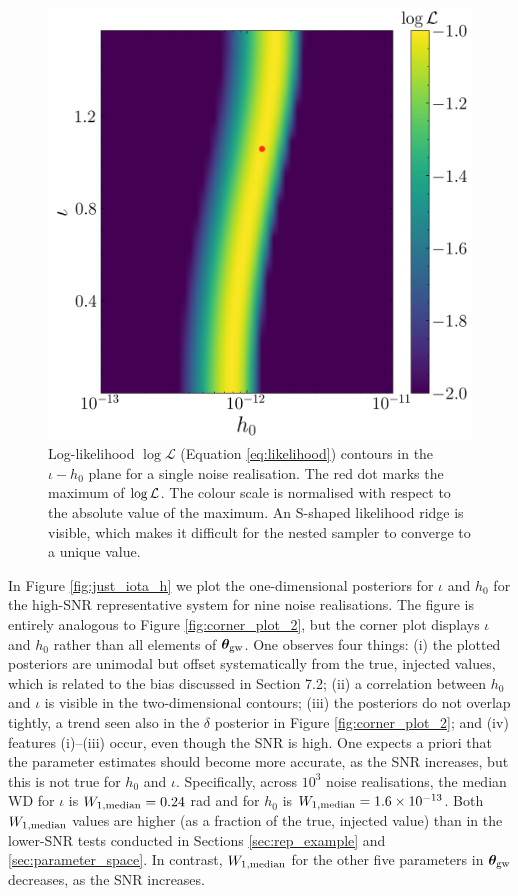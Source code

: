 \documentclass[fleqn,usenatbib,useAMS]{mnras}
\begin{document}
\begin{figure}
	\centering
	\includegraphics[width=\columnwidth]{images/likelihood_surface}
	\caption{Log-likelihood $\log \mathcal{L}$ (Equation \ref{eq:likelihood}) contours in the $\iota - h_0$ plane for a single noise realisation. The red dot marks the maximum of $\log {\cal L}$. The colour scale is normalised with respect to the absolute value of the maximum. An S-shaped likelihood ridge is visible, which makes it difficult for the nested sampler to converge to a unique value.}
	\label{fig:likelihood_surface}
\end{figure}
In Figure \ref{fig:just_iota_h} we plot the one-dimensional posteriors for $\iota$ and $h_0$ for the high-SNR representative system for nine noise realisations. 
The figure is entirely analogous to Figure \ref{fig:corner_plot_2}, but the corner plot displays $\iota$ and $h_0$ rather than all elements of $\boldsymbol{\theta}_{\rm gw}$. One observes four things: (i) the plotted posteriors are unimodal but offset systematically from the true, injected values, which is related to the bias discussed in Section 7.2; (ii) a correlation between $h_0$ and $\iota$ is visible in the two-dimensional contours; (iii) the posteriors do not overlap tightly, a trend seen also in the $\delta$ posterior in Figure \ref{fig:corner_plot_2}; and (iv) features (i)--(iii) occur, even though the SNR is high. One expects a priori that the parameter estimates should become more accurate, as the SNR increases, but this is not true for $h_0$ and $\iota$. Specifically, across $10^3$ noise realisations, the median WD for $\iota$ is $W_{1, \rm median}=0.24$ rad and for $h_0$ is  $W_{1, \rm median}=1.6 \times 10^{-13}$. Both $W_{1,{\rm median}}$ values are higher (as a fraction of the true, injected value) than in the lower-SNR tests conducted in Sections \ref{sec:rep_example} and \ref{sec:parameter_space}. In contrast, $W_{1,\rm median}$ for the other five parameters in $\boldsymbol{\theta}_{\rm gw}$ decreases, as the SNR increases. \newline 
\end{document}
